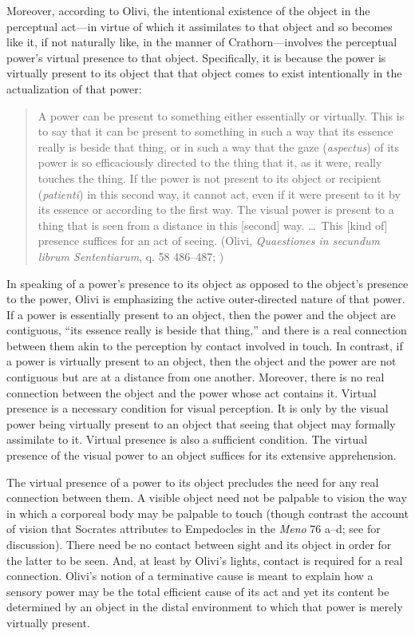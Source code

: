 Moreover, according to Olivi, the intentional existence of the object in the perceptual act---in virtue of which it assimilates to that object and so becomes like it, if not naturally like, in the manner of Crathorn---involves the perceptual power's virtual presence to that object. Specifically, it is because the power is virtually present to its object that that object comes to exist intentionally in the actualization of that power: 
\begin{quote}
	A power can be present to something either essentially or virtually. This is to say that it can be present to something in such a way that its essence really is beside that thing, or in such a way that the gaze (\emph{aspectus}) of its power is so efficaciously directed to the thing that it, as it were, really touches the thing. If the power is not present to its object or recipient (\emph{patienti}) in this second way, it cannot act, even if it were present to it by its essence or according to the first way. The visual power is present to a thing that is seen from a distance in this [second] way. \dots\ This [kind of] presence suffices for an act of seeing. (Olivi, \emph{Quaestiones in secundum librum Sententiarum}, q. 58 486--487; \citealt[151--152]{Toivanen:2013ul})
\end{quote}
In speaking of a power's presence to its object as opposed to the object's presence to the power, Olivi is emphasizing the active outer-directed nature of that power. If a power is essentially present to an object, then the power and the object are contiguous, ``its essence really is beside that thing,'' and there is a real connection between them akin to the perception by contact involved in touch. In contrast, if a power is virtually present to an object, then the object and the power are not contiguous but are at a distance from one another. Moreover, there is no real connection between the object and the power whose act contains it. Virtual presence is a necessary condition for visual perception. It is only by the visual power being virtually present to an object that seeing that object may formally assimilate to it. Virtual presence is also a sufficient condition. The virtual presence of the visual power to an object suffices for its extensive apprehension. 

The virtual presence of a power to its object precludes the need for any real connection between them. A visible object need not be palpable to vision the way in which a corporeal body may be palpable to touch (though contrast the account of vision that Socrates attributes to Empedocles in the \emph{Meno} 76 a--d; see \citealt[chapter 1.2]{Kalderon:2015fr} for discussion). There need be no contact between sight and its object in order for the latter to be seen. And, at least by Olivi's lights, contact is required for a real connection. Olivi's notion of a terminative cause is meant to explain how a sensory power may be the total efficient cause of its act and yet its content be determined by an object in the distal environment to which that power is merely virtually present.

